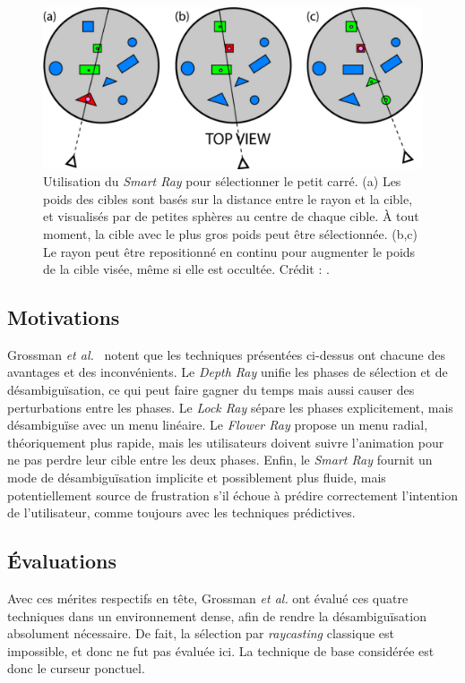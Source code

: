 	\begin{figure}[!htb]
		\centering
		\includegraphics[width=\rayWidth]{figures/ch2/smartRay}
		\caption[Principe du \emph{Smart Ray}]{Utilisation du \emph{Smart Ray} pour sélectionner le petit carré. (a) Les poids des cibles sont basés sur la distance entre le rayon et la cible, et visualisés par de petites sphères au centre de chaque cible. À tout moment, la cible avec le plus gros poids peut être sélectionnée. (b,c) Le rayon peut être repositionné en continu pour augmenter le poids de la cible visée, même si elle est occultée. Crédit : \cite{grossman2006design}.}
		\label{fig:smartRay}
	\end{figure}
	
	\subsection{Motivations}
	Grossman \emph{et al.}~\cite{grossman2006design} notent que les techniques présentées ci-dessus ont chacune des avantages et des inconvénients. Le \emph{Depth Ray} unifie les phases de sélection et de désambiguïsation, ce qui peut faire gagner du temps mais aussi causer des perturbations entre les phases. Le \emph{Lock Ray} sépare les phases explicitement, mais désambiguïse avec un menu linéaire. Le \emph{Flower Ray} propose un menu radial, théoriquement plus rapide, mais les utilisateurs doivent suivre l'animation pour ne pas perdre leur cible entre les deux phases. Enfin, le \emph{Smart Ray} fournit un mode de désambiguïsation implicite et possiblement plus fluide, mais potentiellement source de frustration s'il échoue à prédire correctement l'intention de l'utilisateur, comme toujours avec les techniques prédictives.
	
	\subsection{Évaluations}
	Avec ces mérites respectifs en tête, Grossman \emph{et al.} ont évalué ces quatre techniques dans un environnement dense, afin de rendre la désambiguïsation absolument nécessaire. De fait, la sélection par \emph{raycasting} classique est impossible, et donc ne fut pas évaluée ici. La technique de base considérée est donc le curseur ponctuel.

